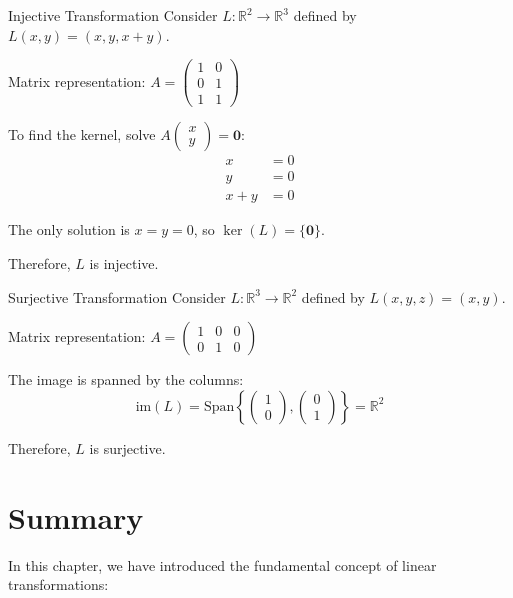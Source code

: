 \documentclass[12pt,a4paper]{article}
\newcommand{\R}{\mathbb{R}}
\newcommand{\vzero}{\mathbf{0}}
\newcommand{\Span}{\text{Span}}
\newcommand{\im}{\text{im}}
\begin{document}
	\begin{example}{Injective Transformation}
		Consider $L: \R^2 \to \R^3$ defined by $L(x, y) = (x, y, x+y)$.
		
		Matrix representation: $A = \begin{pmatrix} 1 & 0 \\ 0 & 1 \\ 1 & 1 \end{pmatrix}$
		
		To find the kernel, solve $A\begin{pmatrix} x \\ y \end{pmatrix} = \vzero$:
		\begin{align*}
			x &= 0 \\
			y &= 0 \\
			x + y &= 0
		\end{align*}
		
		The only solution is $x = y = 0$, so $\ker(L) = \{\vzero\}$.
		
		Therefore, $L$ is injective.
	\end{example}
	
	\begin{example}{Surjective Transformation}
		Consider $L: \R^3 \to \R^2$ defined by $L(x, y, z) = (x, y)$.
		
		Matrix representation: $A = \begin{pmatrix} 1 & 0 & 0 \\ 0 & 1 & 0 \end{pmatrix}$
		
		The image is spanned by the columns:
		\[
		\im(L) = \Span\left\{\begin{pmatrix} 1 \\ 0 \end{pmatrix}, \begin{pmatrix} 0 \\ 1 \end{pmatrix}\right\} = \R^2
		\]
		
		Therefore, $L$ is surjective.
	\end{example}
	
	\newpage
	
	\section{Summary}
	
	In this chapter, we have introduced the fundamental concept of linear transformations:
	
\end{document}
